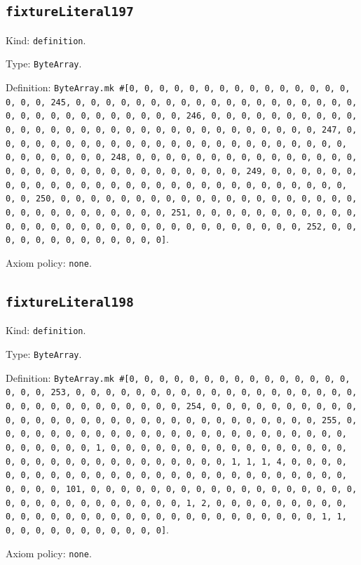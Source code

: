 \documentclass[11pt]{article}
\begin{document}
\subsection*{\texttt{fixtureLiteral197}}
\noindent Kind: \texttt{definition}.\par
\noindent Type: \texttt{ByteArray}.\par
\noindent Definition: \texttt{ByteArray.mk \#[0, 0, 0, 0, 0, 0, 0, 0, 0, 0, 0, 0, 0, 0, 0, 0, 0, 0, 245, 0, 0, 0, 0, 0, 0, 0, 0, 0, 0, 0, 0, 0, 0, 0, 0, 0, 0, 0, 0, 0, 0, 0, 0, 0, 0, 0, 0, 0, 0, 0, 246, 0, 0, 0, 0, 0, 0, 0, 0, 0, 0, 0, 0, 0, 0, 0, 0, 0, 0, 0, 0, 0, 0, 0, 0, 0, 0, 0, 0, 0, 0, 0, 247, 0, 0, 0, 0, 0, 0, 0, 0, 0, 0, 0, 0, 0, 0, 0, 0, 0, 0, 0, 0, 0, 0, 0, 0, 0, 0, 0, 0, 0, 0, 0, 248, 0, 0, 0, 0, 0, 0, 0, 0, 0, 0, 0, 0, 0, 0, 0, 0, 0, 0, 0, 0, 0, 0, 0, 0, 0, 0, 0, 0, 0, 0, 0, 249, 0, 0, 0, 0, 0, 0, 0, 0, 0, 0, 0, 0, 0, 0, 0, 0, 0, 0, 0, 0, 0, 0, 0, 0, 0, 0, 0, 0, 0, 0, 0, 250, 0, 0, 0, 0, 0, 0, 0, 0, 0, 0, 0, 0, 0, 0, 0, 0, 0, 0, 0, 0, 0, 0, 0, 0, 0, 0, 0, 0, 0, 0, 0, 251, 0, 0, 0, 0, 0, 0, 0, 0, 0, 0, 0, 0, 0, 0, 0, 0, 0, 0, 0, 0, 0, 0, 0, 0, 0, 0, 0, 0, 0, 0, 0, 252, 0, 0, 0, 0, 0, 0, 0, 0, 0, 0, 0, 0, 0]}.\par
\noindent Axiom policy: \texttt{none}.\par
\subsection*{\texttt{fixtureLiteral198}}
\noindent Kind: \texttt{definition}.\par
\noindent Type: \texttt{ByteArray}.\par
\noindent Definition: \texttt{ByteArray.mk \#[0, 0, 0, 0, 0, 0, 0, 0, 0, 0, 0, 0, 0, 0, 0, 0, 0, 0, 253, 0, 0, 0, 0, 0, 0, 0, 0, 0, 0, 0, 0, 0, 0, 0, 0, 0, 0, 0, 0, 0, 0, 0, 0, 0, 0, 0, 0, 0, 0, 0, 254, 0, 0, 0, 0, 0, 0, 0, 0, 0, 0, 0, 0, 0, 0, 0, 0, 0, 0, 0, 0, 0, 0, 0, 0, 0, 0, 0, 0, 0, 0, 0, 255, 0, 0, 0, 0, 0, 0, 0, 0, 0, 0, 0, 0, 0, 0, 0, 0, 0, 0, 0, 0, 0, 0, 0, 0, 0, 0, 0, 0, 0, 0, 1, 0, 0, 0, 0, 0, 0, 0, 0, 0, 0, 0, 0, 0, 0, 0, 0, 0, 0, 0, 0, 0, 0, 0, 0, 0, 0, 0, 0, 0, 0, 0, 1, 1, 1, 4, 0, 0, 0, 0, 0, 0, 0, 0, 0, 0, 0, 0, 0, 0, 0, 0, 0, 0, 0, 0, 0, 0, 0, 0, 0, 0, 0, 0, 0, 0, 0, 101, 0, 0, 0, 0, 0, 0, 0, 0, 0, 0, 0, 0, 0, 0, 0, 0, 0, 0, 0, 0, 0, 0, 0, 0, 0, 0, 0, 0, 0, 0, 1, 2, 0, 0, 0, 0, 0, 0, 0, 0, 0, 0, 0, 0, 0, 0, 0, 0, 0, 0, 0, 0, 0, 0, 0, 0, 0, 0, 0, 0, 0, 0, 1, 1, 0, 0, 0, 0, 0, 0, 0, 0, 0, 0, 0]}.\par
\noindent Axiom policy: \texttt{none}.\par
\end{document}
